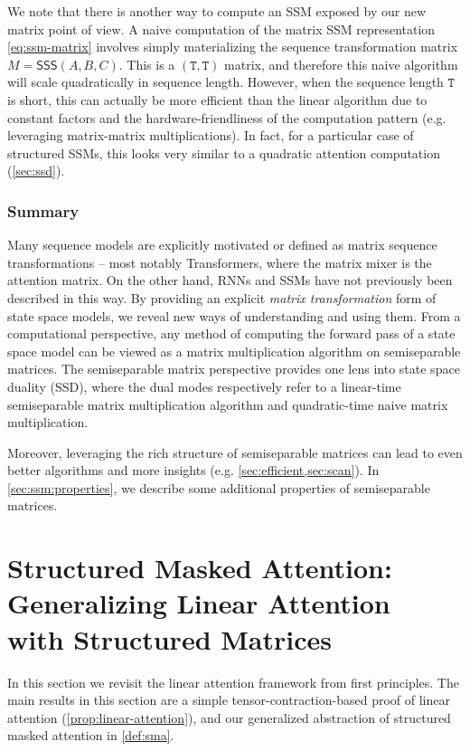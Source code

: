 \documentclass{article}
\begin{document}
We note that there is another way to compute an SSM exposed by our new matrix point of view.
A naive computation of the matrix SSM representation \eqref{eq:ssm-matrix} involves simply materializing the sequence transformation matrix $M=\mathsf{SSS}(A, B, C)$.
This is a $\mathtt{(T,T)}$ matrix, and therefore this naive algorithm will scale quadratically in sequence length.
However, when the sequence length $\mathtt{T}$ is short, this can actually be more efficient than the linear algorithm due to constant factors and the hardware-friendliness of the computation pattern (e.g. leveraging matrix-matrix multiplications).
In fact, for a particular case of structured SSMs, this looks very similar to a quadratic attention computation (\cref{sec:ssd}).

\subsubsection{Summary}

Many sequence models are explicitly motivated or defined as matrix sequence transformations --
most notably Transformers, where the matrix mixer is the attention matrix.
On the other hand, RNNs and SSMs have not previously been described in this way.
By providing an explicit \emph{matrix transformation} form of state space models,
we reveal new ways of understanding and using them.
From a computational perspective, any method of computing the forward pass of a state space model can be
viewed as a matrix multiplication algorithm on semiseparable matrices.
The semiseparable matrix perspective provides one lens into state space duality (SSD),
where the dual modes respectively refer to a linear-time semiseparable matrix multiplication algorithm and quadratic-time naive matrix multiplication.

Moreover, leveraging the rich structure of semiseparable matrices can lead to even better algorithms and more insights (e.g. \cref{sec:efficient,sec:scan}).
In \cref{sec:ssm:properties}, we describe some additional properties of semiseparable matrices.

\section{Structured Masked Attention: Generalizing Linear Attention \texorpdfstring{\\}{} with Structured Matrices}
\label{sec:attention}

In this section we revisit the linear attention framework from first principles.
The main results in this section are a simple tensor-contraction-based proof of linear attention (\cref{prop:linear-attention}),
and our generalized abstraction of structured masked attention in \cref{def:sma}.
\iftoggle{arxiv}{
We note that this section derives the main duality results from a different direction than state space models and can be read completely independently of \cref{sec:ssm}.
}{}
\end{document}
